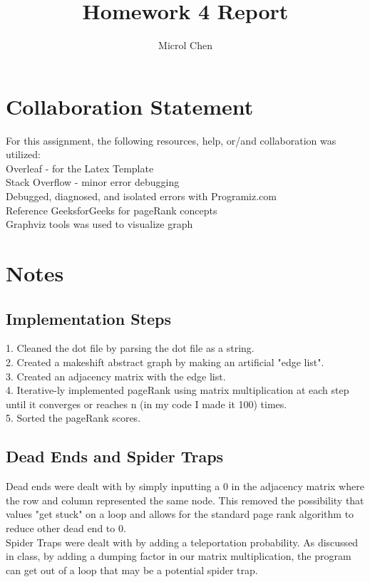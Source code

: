 \documentclass{article}
\title{Homework 4 Report}
\author{Microl Chen}
\begin{document}
\maketitle

\section{Collaboration Statement}
For this assignment, the following resources, help, or/and collaboration was utilized:
\\Overleaf - for the Latex Template
\\Stack Overflow - minor error debugging
\\Debugged, diagnosed, and isolated errors with Programiz.com
\\Reference GeeksforGeeks for pageRank concepts
\\Graphviz tools was used to visualize graph


\section{Notes}
\subsection{Implementation Steps}
1. Cleaned the dot file by parsing the dot file as a string. \\
2. Created a makeshift abstract graph by making an artificial "edge list". \\
3. Created an adjacency matrix with the edge list. \\
4. Iterative-ly implemented pageRank using matrix multiplication at each step until it converges or reaches n (in my code I made it 100) times. \\
5. Sorted the pageRank scores.

\subsection{Dead Ends and Spider Traps}
Dead ends were dealt with by simply inputting a 0 in the adjacency matrix where the row and column represented the same node. This removed the possibility that values "get stuck" on a loop and allows for the standard page rank algorithm to reduce other dead end to 0. \\

\noindent
Spider Traps were dealt with by adding a teleportation probability. As discussed in class, by adding a dumping factor in our matrix multiplication, the program can get out of a loop that may be a potential spider trap.
\end{document}
